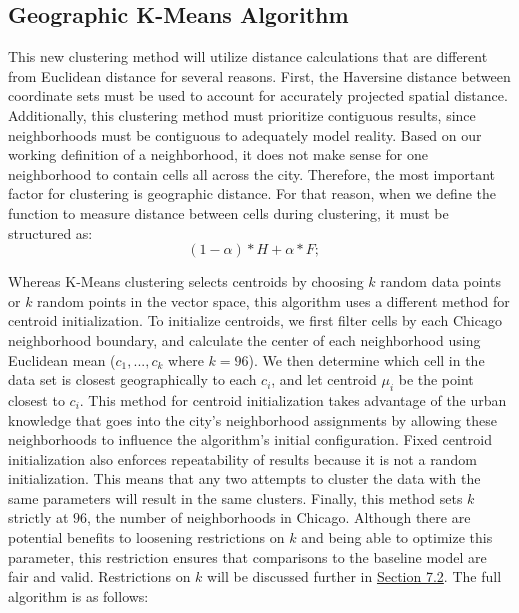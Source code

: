 \documentclass[times new roman,12pt]{article}
\begin{document}
\subsection{Geographic K-Means Algorithm}
\label{algo}

This new clustering method will utilize distance calculations that are different from Euclidean distance for several reasons. First, the Haversine distance between coordinate sets must be used to account for accurately projected spatial distance. Additionally, this clustering method must prioritize contiguous results, since neighborhoods must be contiguous to adequately model reality. Based on our working definition of a neighborhood, it does not make sense for one neighborhood to contain cells all across the city. Therefore, the most important factor for clustering is geographic distance. For that reason, when we define the function to measure distance between cells during clustering, it must be structured as:
$$(1-\alpha) * H + \alpha * F; \hspace{10pt}$$


Whereas K-Means clustering selects centroids by choosing $k$ random data points or $k$ random points in the vector space, this algorithm uses a different method for centroid initialization. To initialize centroids, we first filter cells by each Chicago neighborhood boundary, and calculate the center of each neighborhood using Euclidean mean ($c_1,...,c_{k}$ where $k=96$). We then determine which cell in the data set is closest geographically to each $c_i$, and let centroid $\mu_i$ be the point closest to $c_i$. This method for centroid initialization takes advantage of the urban knowledge that goes into the city's neighborhood assignments by allowing these neighborhoods to influence the algorithm's initial configuration. Fixed centroid initialization also enforces repeatability of results because it is not a random initialization. This means that any two attempts to cluster the data with the same parameters will result in the same clusters. Finally, this method sets $k$ strictly at $96$, the number of neighborhoods in Chicago. Although there are potential benefits to loosening restrictions on $k$ and being able to optimize this parameter, this restriction ensures that comparisons to the baseline model are fair and valid. Restrictions on $k$ will be discussed further in \hyperref[future_work]{Section 7.2}. The full algorithm is as follows:
\end{document}
